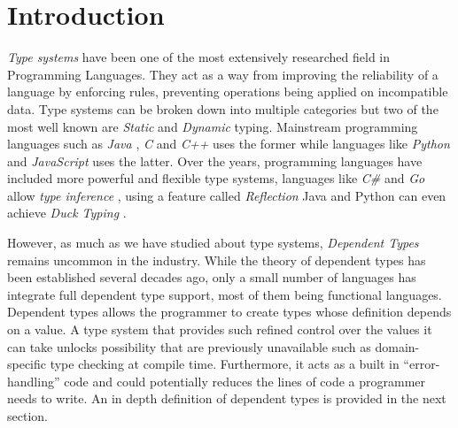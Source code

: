 \documentclass[a4paper,12pt]{report}
\begin{document}
\pagestyle{empty}
\singlespacing

\onehalfspacing

\singlespacing


\setcounter{page}{0}
\pagestyle{plain}
\tableofcontents
\listoffigures
\listoftables

\onehalfspacing


\chapter{Introduction}
\setcounter{page}{1} 
\textit{Type systems} \cite{typesystem} have been one of the most extensively researched field in 
Programming Languages. They act as a way from improving the reliability of a 
language by enforcing rules, preventing operations being applied on 
incompatible data. Type systems can be broken down into multiple categories but 
two of the most well known are \textit{Static} \cite{staticTyping} and 
\textit{Dynamic} \cite{dynamicTyping} typing. Mainstream programming 
languages such as \textit{Java} \cite{java}, \textit{C} \cite{c} and \textit{C++} \cite{cpp} 
uses the former while languages like \textit{Python} \cite{python} and 
\textit{JavaScript} \cite{js} uses the latter. 
Over the years, programming languages have included more powerful and flexible 
type systems, languages like \textit{C\#} \cite{cSharp} and \textit{Go} \cite{goInferenceType} allow 
\textit{type inference} \cite{inferenceType}, using a feature called \textit{Reflection} 
Java and Python can even achieve \textit{Duck Typing} \cite{javaDuckType}.

\par
However, as much as we have studied about type systems, \textit{Dependent Types} 
\cite{depenTypeAtWork} remains uncommon in the industry. While the theory of dependent types has been 
established several decades ago, only a small number of languages has 
integrate full dependent type support, most of them being functional languages. 
Dependent types allows the programmer to create types whose definition depends 
on a value. A type system that provides such refined control over the values it 
can take unlocks possibility that are previously unavailable such as 
domain-specific type checking at compile time. Furthermore, it acts as a built 
in ``error-handling'' code and could potentially 
reduces the lines of code a programmer needs to write. An in depth 
definition of dependent types is provided in the next section.
\end{document}
